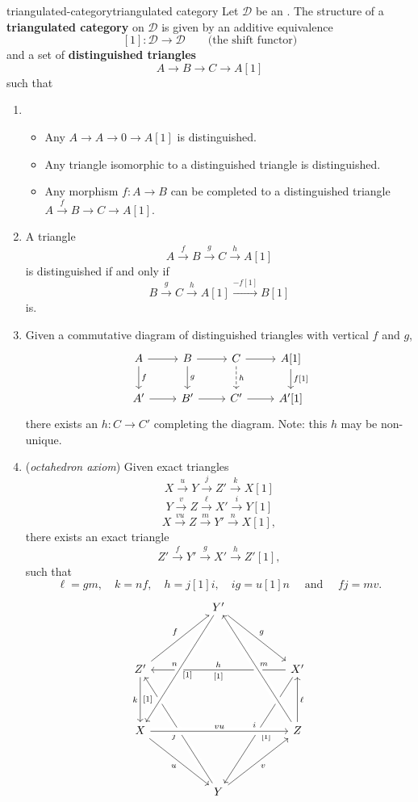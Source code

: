 \begin{topic}{triangulated-category}{triangulated category}
    Let $\mathcal{D}$ be an . The structure of a \textbf{triangulated category} on $\mathcal{D}$ is given by an additive equivalence
    \[ [1] : \mathcal{D} \to \mathcal{D} \qquad \text{(the shift functor)} \]
    and a set of \textbf{distinguished triangles}
    \[ A \to B \to C \to A[1] \]
    such that
    \begin{enumerate}[(1)]
        \item \begin{itemize}
            \item Any $A \to A \to 0 \to A[1]$ is distinguished.
            \item Any triangle isomorphic to a distinguished triangle is distinguished.
            \item Any morphism $f : A \to B$ can be completed to a distinguished triangle $A \overset{f}{\to} B \to C \to A[1]$.
        \end{itemize}
        \item A triangle
        \[ A \xrightarrow{f} B \xrightarrow{g} C \xrightarrow{h} A[1] \]
        is distinguished if and only if
        \[ B \xrightarrow{g} C \xrightarrow{h} A[1] \xrightarrow{-f[1]} B[1] \]
        is.
        \item Given a commutative diagram of distinguished triangles with vertical $f$ and $g$,
        \[ \begin{tikzcd}
            A \arrow{r} \arrow{d}{f} & B \arrow{r} \arrow{d}{g} & C \arrow{r} \arrow[dashed]{d}{h} & A[1] \arrow{d}{f[1]} \\
            A' \arrow{r} & B' \arrow{r} & C' \arrow{r} & A'[1]
        \end{tikzcd} \]
        there exists an $h : C \to C'$ completing the diagram. Note: this $h$ may be non-unique.
        \item (\textit{octahedron axiom}) Given exact triangles
        \[ X \xrightarrow{u} Y \xrightarrow{j} Z' \xrightarrow{k} X[1] \]
        \[ Y \xrightarrow{v} Z \xrightarrow{\ell} X' \xrightarrow{i} Y[1] \]
        \[ X \xrightarrow{vu} Z \xrightarrow{m} Y' \xrightarrow{n} X[1] , \]
        there exists an exact triangle
        \[ Z' \xrightarrow{f} Y' \xrightarrow{g} X' \xrightarrow{h} Z'[1] , \]
        such that 
        \[ \ell = gm, \quad k = nf, \quad h = j[1]i, \quad ig = u[1]n \quad \text{ and } \quad fj = mv . \]
        \[ \begin{tikzcd}[row sep=4em, column sep=5em] & Y' \arrow{rd}{g} & \\ Z' \arrow{ur}{f} \arrow[d, swap,"k","{[}1{]}"'] \ar[from=ddr, crossing over]{}{j} & & X' \arrow[ddl, swap, "i", "{[}1{]}"'] \arrow[ll, "h"',"{[}1{]}"] \\ X \arrow[swap]{dr}{u} \arrow[crossing over]{rr}{vu} \arrow[swap, from=uur, crossing over, "n", "{[}1{]}"'] & & Z \arrow[swap]{u}{\ell} \arrow[crossing over, swap]{uul}{m} \\ & Y \arrow[swap]{ur}{v} & \end{tikzcd} \]
    \end{enumerate}
\end{topic}

